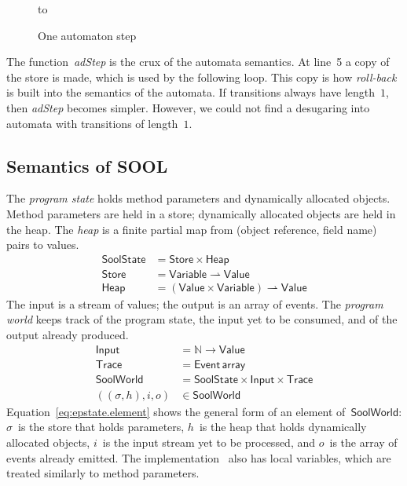 \documentclass[preprint]{sigplanconf} %
\newcommand{\N}{\ensuremath{\mathbb{N}}}
\newcommand{\pmap}{\rightharpoonup}
\newcommand{\set}[1]{\ensuremath{\mathsf{#1}}}
\theoremstyle{definition}
\theoremstyle{remark}
\begin{document}
\begin{figure}
\hbox to
\caption{One automaton step}
\label{fig:adStep}
\end{figure}

The function~\textit{adStep} is the crux of the automata semantics.
At line~5 a copy of the store is made, which is used by the following loop.
This copy is how \emph{roll-back} is built into the semantics of the automata.
If transitions always have length~$1$, then \textit{adStep} becomes simpler.
However, we could not find a desugaring into automata with transitions of length~$1$.

\subsection{Semantics of SOOL} \label{sec:semantics.sool} %

The \emph{program state} holds method parameters and dynamically allocated objects.
Method parameters are held in a store;
dynamically allocated objects are held in the heap.
The \emph{heap} is a finite partial map from (object reference, field name) pairs to values.
\begin{align}
\set{SoolState}&=\set{Store}\times\set{Heap}\\
\set{Store}&=\set{Variable}\pmap\set{Value} \\
\set{Heap}&=(\set{Value}\times\set{Variable})\pmap\set{Value}
\end{align}
The input is a stream of values;
the output is an array of events.
The \emph{program world} keeps track of the program state, the input yet to be consumed, and of the output already produced.
\begin{align}
\set{Input}&=\N\to\set{Value} \label{eq:input}\\
\set{Trace}&=\set{Event}\,\mathsf{array} \\
\set{SoolWorld}&=\set{SoolState}\times\set{Input}\times\set{Trace} \\
((\sigma, h), i, o)&\in\set{SoolWorld} \label{eq:epstate.element}
\end{align}
Equation~\eqref{eq:epstate.element} shows the general form of an element of~\set{SoolWorld}: $\sigma$~is the store that holds parameters, $h$~is the heap that holds dynamically allocated objects, $i$~is the input stream yet to be processed, and $o$~is the array of events already emitted.
The implementation~\cite{web:topl.prototype} also has local variables, which are treated similarly to method parameters.
\end{document}
